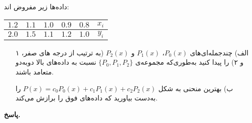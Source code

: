 داده‌ها زیر مفروض ‌اند:
\begin{center}
	\begin{tabular}{ccccc|c}
		 \(1.2\)& \(1.1\) &\(1.0\)&\(0.9\) & \(0.8\) & \(x_i\)\\
		\hline
		\(2.0\)& \(1.5\) & \(1.1\) & \(1.2\) &\( 1.0\) & \(y_i\)
	\end{tabular}
\end{center}
\begin{enumerate}
	\item[الف)] چندجمله‌ای‌های
	\(P_0(x)\)،
	\(P_1(x)\) و
	\(P_2(x)\)
	(به ترتیب از درجه های صفر، ۱ و ۲) را پیدا کنید به‌طوری‌که مجموعه‌ی
	\(\{P_0, P_1, P_2\}\)
	نسبت به داده‌های بالا دو‌به‌دو متعامد باشند.
	\vspace*{.3cm}
	\item[ب)] 
	بهترین منحنی به شکل 
	\(P(x) = c_0P_0(x)+c_1P_1(x)+c_2P_2(x)\)
	را به‌دست بیاورید که داده‌های فوق را برازش می‌کند.
\end{enumerate}



\begin{answer}

	\textbf{پاسخ.}
	
\end{answer}
